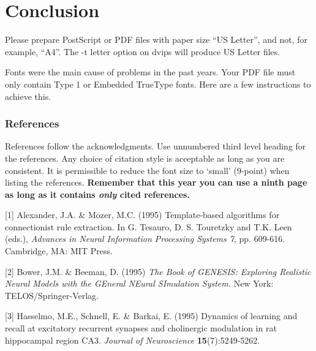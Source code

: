 \documentclass{article} %
\begin{document}
\section{Conclusion}

Please prepare PostScript or PDF files with paper size ``US Letter'', and
not, for example, ``A4''. The -t
letter option on dvips will produce US Letter files.

Fonts were the main cause of problems in the past years. Your PDF file must
only contain Type 1 or Embedded TrueType fonts. Here are a few instructions
to achieve this.

\subsubsection*{References}

References follow the acknowledgments. Use unnumbered third level heading for
the references. Any choice of citation style is acceptable as long as you are
consistent. It is permissible to reduce the font size to `small' (9-point) 
when listing the references. {\bf Remember that this year you can use
a ninth page as long as it contains \emph{only} cited references.}

\small{
[1] Alexander, J.A. \& Mozer, M.C. (1995) Template-based algorithms
for connectionist rule extraction. In G. Tesauro, D. S. Touretzky
and T.K. Leen (eds.), {\it Advances in Neural Information Processing
Systems 7}, pp. 609-616. Cambridge, MA: MIT Press.

[2] Bower, J.M. \& Beeman, D. (1995) {\it The Book of GENESIS: Exploring
Realistic Neural Models with the GEneral NEural SImulation System.}
New York: TELOS/Springer-Verlag.

[3] Hasselmo, M.E., Schnell, E. \& Barkai, E. (1995) Dynamics of learning
and recall at excitatory recurrent synapses and cholinergic modulation
in rat hippocampal region CA3. {\it Journal of Neuroscience}
{\bf 15}(7):5249-5262.
}
\nocite{*}


\end{document}
